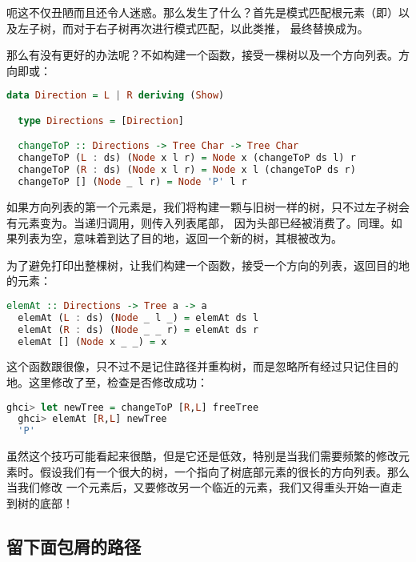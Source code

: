 \documentclass[./main.tex]{subfiles}
\begin{document}
呃这不仅丑陋而且还令人迷惑。那么发生了什么？首先是模式匹配根元素（即）以及左子树，而对于右子树再次进行模式匹配，以此类推，
最终替换成为。

那么有没有更好的办法呢？不如构建一个函数，接受一棵树以及一个方向列表。方向即或：

\begin{lstlisting}[language=Haskell]
  data Direction = L | R deriving (Show)

  type Directions = [Direction]

  changeToP :: Directions -> Tree Char -> Tree Char
  changeToP (L : ds) (Node x l r) = Node x (changeToP ds l) r
  changeToP (R : ds) (Node x l r) = Node x l (changeToP ds r)
  changeToP [] (Node _ l r) = Node 'P' l r
\end{lstlisting}

如果方向列表的第一个元素是，我们将构建一颗与旧树一样的树，只不过左子树会有元素变为。当递归调用，则传入列表尾部，
因为头部已经被消费了。同理。如果列表为空，意味着到达了目的地，返回一个新的树，其根被改为。

为了避免打印出整棵树，让我们构建一个函数，接受一个方向的列表，返回目的地的元素：

\begin{lstlisting}[language=Haskell]
  elemAt :: Directions -> Tree a -> a
  elemAt (L : ds) (Node _ l _) = elemAt ds l
  elemAt (R : ds) (Node _ _ r) = elemAt ds r
  elemAt [] (Node x _ _) = x
\end{lstlisting}

这个函数跟很像，只不过不是记住路径并重构树，而是忽略所有经过只记住目的地。这里修改了至，检查是否修改成功：

\begin{lstlisting}[language=Haskell]
  ghci> let newTree = changeToP [R,L] freeTree
  ghci> elemAt [R,L] newTree
  'P'
\end{lstlisting}

虽然这个技巧可能看起来很酷，但是它还是低效，特别是当我们需要频繁的修改元素时。假设我们有一个很大的树，一个指向了树底部元素的很长的方向列表。那么当我们修改
一个元素后，又要修改另一个临近的元素，我们又得重头开始一直走到树的底部！

\subsection*{留下面包屑的路径}
\end{document}
